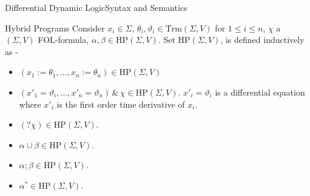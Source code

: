 \documentclass{beamer}
\newcommand{\Trm}{\text{Trm}}
\newcommand{\HP}{\text{HP}}
\begin{document}
\begin{frame}{Differential Dynamic Logic}{Syntax and Semantics}
  \begin{block}{Hybrid Programs}
  Consider $x_i \in \Sigma$, $\theta_i, \vartheta_i \in \Trm(\Sigma, V)$ for
  $1 \leq i \leq n$, $\chi$ a $(\Sigma,V)$ FOL-formula, $\alpha, \beta \in
  \HP(\Sigma,V)$.
    Set $\HP(\Sigma,V)$, is defined inductively as -
    \begin{itemize}
      \item  $(x_1 := \theta_1, \ldots , x_n := \theta_n) \in \HP(\Sigma,V)$
      \item $ (x'_1 = \vartheta_i, \ldots , x'_n = \vartheta_n)\, \& \, \chi \in
        \HP(\Sigma,V)$. $x'_i = \vartheta_i$ is a differential equation where
        $x'_i$ is the first order time derivative of $x_i$.
      \item $(?\chi) \in \HP(\Sigma,V)$.
      \item $\alpha \cup \beta \in \HP(\Sigma, V)$.
      \item $\alpha;\beta \in \HP(\Sigma, V)$.
      \item $\alpha^* \in \HP(\Sigma, V)$.
    \end{itemize}
  \end{block}
\end{frame}
\end{document}
